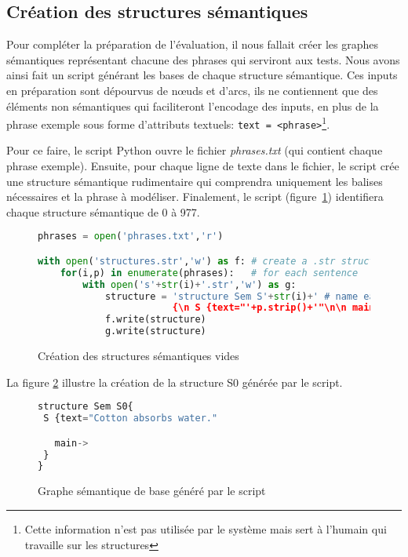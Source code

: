 \subsection{Création des structures sémantiques}\label{sec:pythonstruc}

Pour compléter la préparation de l'évaluation, il nous fallait créer les graphes sémantiques représentant chacune des phrases qui serviront aux tests. Nous avons ainsi fait un script générant les bases de chaque structure sémantique. Ces inputs en préparation sont dépourvus de n\oe{}uds et d'arcs, ils ne contiennent que des éléments non sémantiques qui faciliteront l'encodage des inputs, en plus de la phrase exemple sous forme d'attributs textuels: \texttt{text = <phrase>}\footnote{Cette information n'est pas utilisée par le système mais sert à l'humain qui travaille sur les structures}.

Pour ce faire, le script Python ouvre le fichier \emph{phrases.txt} (qui contient chaque phrase exemple). Ensuite, pour chaque ligne de texte dans le fichier, le script crée une structure sémantique rudimentaire qui comprendra uniquement les balises nécessaires et la phrase à modéliser. Finalement, le script (figure~\ref{structurepython}) identifiera chaque structure sémantique de 0 à 977.

\begin{figure}[htb]
  \caption{Création des structures sémantiques vides}
	\label{structurepython}
\begin{lstlisting}[language=Python]
phrases = open('phrases.txt','r')

with open('structures.str','w') as f: # create a .str structure
    for(i,p) in enumerate(phrases):   # for each sentence
        with open('s'+str(i)+'.str','w') as g:
            structure = 'structure Sem S'+str(i)+' # name each structure by enumeration
						{\n S {text="'+p.strip()+'"\n\n main-> \n }\n}' #insert as text the sentence
            f.write(structure)
            g.write(structure)
\end{lstlisting}
\end{figure}

La figure \ref{fig:RSem0} illustre la création de la structure S0 générée par le script.

\begin{figure}[htb]
  \caption{Graphe sémantique de base généré par le script}
	\label{fig:RSem0}
\begin{lstlisting}[language=Python]
structure Sem S0{
 S {text="Cotton absorbs water."

   main-> 
 }
}
\end{lstlisting}
\end{figure}

